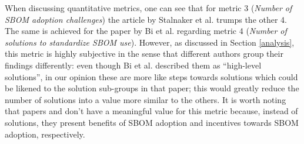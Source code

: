 When discussing quantitative metrics, one can see that for metric 3 (\emph{Number of SBOM adoption challenges}) the article by Stalnaker et al. \cite{article:software-bom} trumps the other 4. The same is achieved for the paper by Bi et al. \cite{article:sboms-issues-solutions} regarding metric 4 (\emph{Number of solutions to standardize SBOM use}). However, as discussed in Section \ref{analysis}, this metric is highly subjective in the sense that different authors group their findings differently: even though Bi et al. described them as \enquote{high-level solutions}, in our opinion these are more like steps towards solutions which could be likened to the solution sub-groups in that paper; this would greatly reduce the number of solutions into a value more similar to the others. It is worth noting that papers \cite{article:sbom-required} and \cite{article:business-sbom} don't have a meaningful value for this metric because, instead of solutions, they present benefits of SBOM adoption and incentives towards SBOM adoption, respectively.